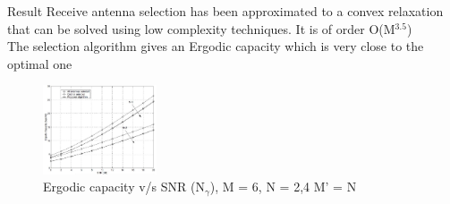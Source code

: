 \documentclass{beamer}
\begin{document}
\begin{frame}{Result}
Receive antenna selection has been approximated to a convex relaxation  that can be solved using low complexity techniques. It is of order O(M$^{3.5}$)\\
\vskip 0.1in
The selection algorithm gives an Ergodic capacity which is very close to the optimal one
\begin{figure}[h]
\centering
\includegraphics[width=0.3\textwidth]{SNR.JPG}
\caption{Ergodic capacity v/s SNR (N$_\gamma$), M = 6, N = 2,4 M' = N}
\end{figure}
\end{frame}
\end{document}
